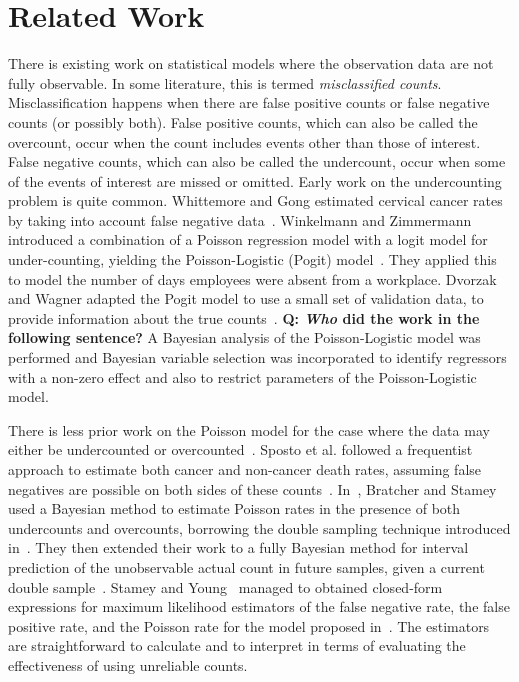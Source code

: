 
\section{Related Work}
\label{sec:related}

There is existing work on statistical models where the observation data are not fully observable. In some literature, this is termed \emph{misclassified counts}. Misclassification happens when there are false positive counts or false negative counts (or possibly both). False positive counts, which can also be called the overcount, occur when the count includes events other than those of interest. False negative counts, which can also be called the undercount, occur when some of the events of interest are missed or omitted. Early work on the undercounting problem is quite common. Whittemore and Gong estimated cervical cancer rates by taking into account false negative data~\cite{whittemore1991}. Winkelmann and Zimmermann introduced a combination of a Poisson regression model with a logit model for under-counting, yielding the Poisson-Logistic (Pogit) model~\cite{winkelmann1993poisson}. They applied this to model the number of days employees were absent from a workplace. Dvorzak and Wagner adapted the Pogit model to use a small set of validation data, to provide information about the true counts~\cite{dvorzak2016}. \textbf{Q: \emph{Who} did the work in the following sentence?} A Bayesian analysis of the Poisson-Logistic model was performed and Bayesian variable selection was incorporated to identify regressors with a non-zero effect and also to restrict parameters of the Poisson-Logistic model.

There is less prior work on the Poisson model for the case where the data may either be undercounted or overcounted~\cite{sposto1992, bratcher2002, bratcher2004, stamey2005}. Sposto et al. followed a frequentist approach to estimate both cancer and non-cancer death rates, assuming false negatives are possible on both sides of these counts~\cite{sposto1992}. In~\cite{bratcher2002}, Bratcher and Stamey used a Bayesian method to estimate Poisson rates in the presence of both undercounts and overcounts, borrowing the double sampling technique introduced in~\cite{Tenenbein1970}. They then extended their work to a fully Bayesian method for interval prediction of the unobservable actual count in future samples, given a current double sample~\cite{bratcher2004}. Stamey and Young~\cite{stamey2005} managed to obtained closed-form expressions for maximum likelihood estimators of the false negative rate, the false positive rate, and the Poisson rate for the model proposed in~\cite{bratcher2002}. The estimators are straightforward to calculate and to interpret in terms of evaluating the effectiveness of using unreliable counts.

